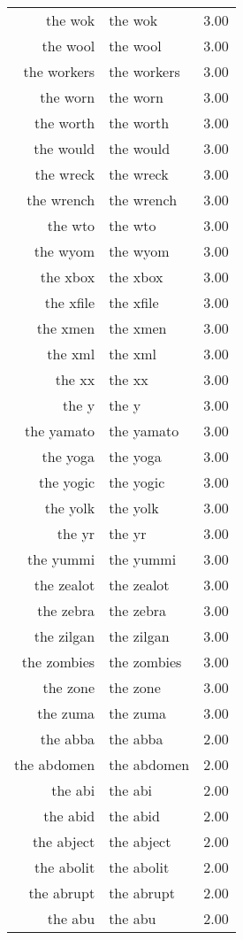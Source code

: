 \begin{table}[ht]
\begin{tabular}{rlr}
  the wok & the wok & 3.00 \\ 
  the wool & the wool & 3.00 \\ 
  the workers & the workers & 3.00 \\ 
  the worn & the worn & 3.00 \\ 
  the worth & the worth & 3.00 \\ 
  the would & the would & 3.00 \\ 
  the wreck & the wreck & 3.00 \\ 
  the wrench & the wrench & 3.00 \\ 
  the wto & the wto & 3.00 \\ 
  the wyom & the wyom & 3.00 \\ 
  the xbox & the xbox & 3.00 \\ 
  the xfile & the xfile & 3.00 \\ 
  the xmen & the xmen & 3.00 \\ 
  the xml & the xml & 3.00 \\ 
  the xx & the xx & 3.00 \\ 
  the y & the y & 3.00 \\ 
  the yamato & the yamato & 3.00 \\ 
  the yoga & the yoga & 3.00 \\ 
  the yogic & the yogic & 3.00 \\ 
  the yolk & the yolk & 3.00 \\ 
  the yr & the yr & 3.00 \\ 
  the yummi & the yummi & 3.00 \\ 
  the zealot & the zealot & 3.00 \\ 
  the zebra & the zebra & 3.00 \\ 
  the zilgan & the zilgan & 3.00 \\ 
  the zombies & the zombies & 3.00 \\ 
  the zone & the zone & 3.00 \\ 
  the zuma & the zuma & 3.00 \\ 
  the abba & the abba & 2.00 \\ 
  the abdomen & the abdomen & 2.00 \\ 
  the abi & the abi & 2.00 \\ 
  the abid & the abid & 2.00 \\ 
  the abject & the abject & 2.00 \\ 
  the abolit & the abolit & 2.00 \\ 
  the abrupt & the abrupt & 2.00 \\ 
  the abu & the abu & 2.00 \\ 

\end{tabular}
\end{table}

